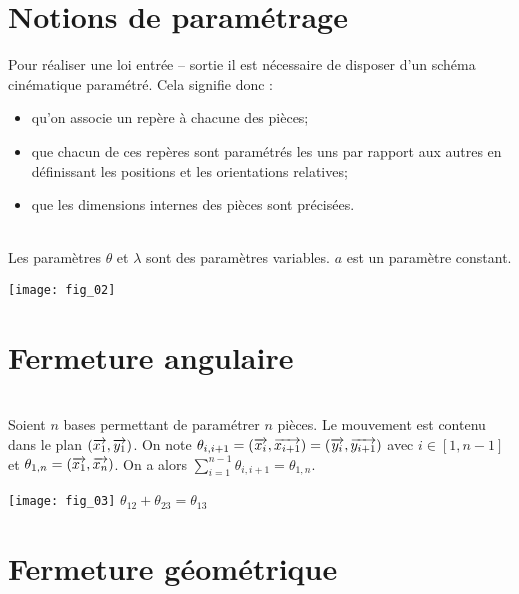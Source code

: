 \section{Notions de paramétrage}
Pour réaliser une loi entrée -- sortie il est nécessaire de disposer d'un schéma cinématique paramétré. Cela signifie donc :
\begin{itemize}
\item qu'on associe un repère à chacune des pièces;
\item que chacun de ces repères sont paramétrés les uns par rapport aux autres en définissant les positions et les orientations relatives;
\item que les dimensions internes des pièces sont précisées. 
\end{itemize}

\begin{exemple}~\\ Les paramètres $\theta$ et $\lambda$ sont des paramètres variables. $a$ est un paramètre constant. 
\begin{center}
\texttt{[image: fig\_02]}
\end{center}
\end{exemple}
\section{Fermeture angulaire}
\begin{minipage}[c]{.65\linewidth}
\begin{methode}~\\
Soient $n$ bases permettant de paramétrer $n$ pièces. Le mouvement est contenu dans le plan $\left(\overrightarrow{x_1},\overrightarrow{y_1}\right)$. On note $\theta_{i,i+1}=\left(\overrightarrow{x_i},\overrightarrow{x_{i+1}}\right)=\left(\overrightarrow{y_i},\overrightarrow{y_{i+1}}\right)$ avec $i \in [1,n-1]$ et $\theta_{1,n}=\left(\overrightarrow{x_1},\overrightarrow{x_{n}}\right)$. On a alors $\sum\limits_{i=1}^{n-1}\theta_{i,i+1}=\theta_{1,n}$.
\end{methode}
\end{minipage}\hfill
\begin{minipage}[c]{.25\linewidth}
\begin{center}
\texttt{[image: fig\_03]}
$\theta_{12}+\theta_{23}=\theta_{13}$

\end{center}
\end{minipage}

\section{Fermeture géométrique}
